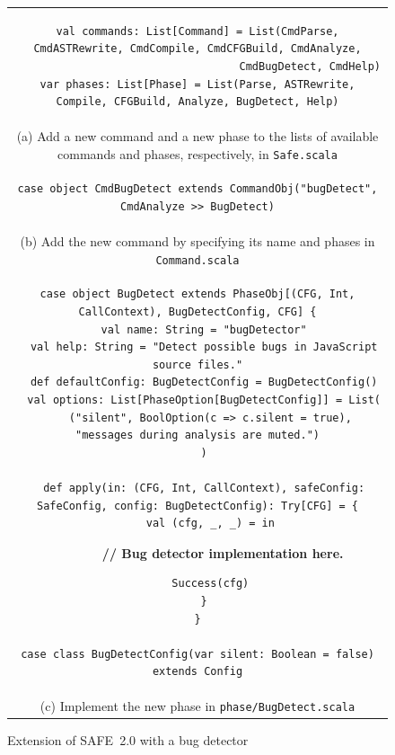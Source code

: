 \documentclass[10pt, conference]{IEEEtran}
\newcommand{\mtt}[1]{\texttt{\small #1}}
\newcommand{\safe}{{SAFE~2.0}\xspace}
\begin{document}
\setcounter{figure}{1}
\begin{figure}[t]
\centering
\begin{tabular}{c}
\begin{minipage}{.95\textwidth}
\footnotesize
\begin{verbatim}
val commands: List[Command] = List(CmdParse, CmdASTRewrite, CmdCompile, CmdCFGBuild, CmdAnalyze,
                                   CmdBugDetect, CmdHelp)
var phases: List[Phase] = List(Parse, ASTRewrite, Compile, CFGBuild, Analyze, BugDetect, Help)
\end{verbatim}
\end{minipage}
\\[1.5em]
{\small (a) Add a new command and a new phase to the lists of available
commands and phases, respectively, in \mtt{Safe.scala}}
\\[1em]
\begin{minipage}{.95\textwidth}
\footnotesize
\begin{verbatim}
case object CmdBugDetect extends CommandObj("bugDetect", CmdAnalyze >> BugDetect)
\end{verbatim}
\end{minipage}
\\[1em]
{\small (b) Add the new command by specifying its name and phases in \mtt{Command.scala}}
\\[1em]
\begin{minipage}{.95\textwidth}
\footnotesize
\begin{verbatim}
case object BugDetect extends PhaseObj[(CFG, Int, CallContext), BugDetectConfig, CFG] {
  val name: String = "bugDetector"
  val help: String = "Detect possible bugs in JavaScript source files."
  def defaultConfig: BugDetectConfig = BugDetectConfig()
  val options: List[PhaseOption[BugDetectConfig]] = List(
    ("silent", BoolOption(c => c.silent = true), "messages during analysis are muted.")
  )

  def apply(in: (CFG, Int, CallContext), safeConfig: SafeConfig, config: BugDetectConfig): Try[CFG] = {
    val (cfg, _, _) = in
\end{verbatim}
\vspace*{-.6em}
\textbf{~~~~~~~// Bug detector implementation here.}
\vspace*{-.8em}
\begin{verbatim}
    Success(cfg)
  }
}

case class BugDetectConfig(var silent: Boolean = false) extends Config
\end{verbatim}
\end{minipage}
\\
{\small (c) Implement the new phase in \mtt{phase/BugDetect.scala}}
\end{tabular}
\caption{\small Extension of \safe with a bug detector~\cite{jswapp}}
\label{fig:extensibility}
\end{figure}
\end{document}
